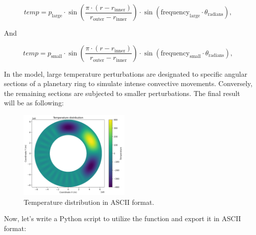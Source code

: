 \documentclass{article}
\begin{document}
\begin{equation}
temp = p_\text{large} \cdot \sin \left( \frac{\pi \cdot (r - r_\text{inner})}{r_\text{outer} - r_\text{inner}} \right) \cdot \sin \left( \text{frequency}_\text{large} \cdot \theta_\text{radians} \right) ,
\end{equation}

And

\begin{equation}
temp = p_\text{small} \cdot \sin \left( \frac{\pi \cdot (r - r_\text{inner})}{r_\text{outer} - r_\text{inner}} \right) \cdot \sin \left( \text{frequency}_\text{small} \cdot \theta_\text{radians} \right) ,
\end{equation}

In the model, large temperature perturbations are designated to specific angular sections of a planetary ring to simulate intense convective movements. Conversely, the remaining sections are subjected to smaller perturbations.
The final result will be as following:

\begin{figure}[h!]
\centering
\includegraphics[width=0.48\textwidth]{ascii_temperature.png}
\caption{Temperature distribution in ASCII format.}
\label{fig:ascii-temperature}
\end{figure}

Now, let's write a Python script to utilize the function and export it in ASCII format:
\end{document}

